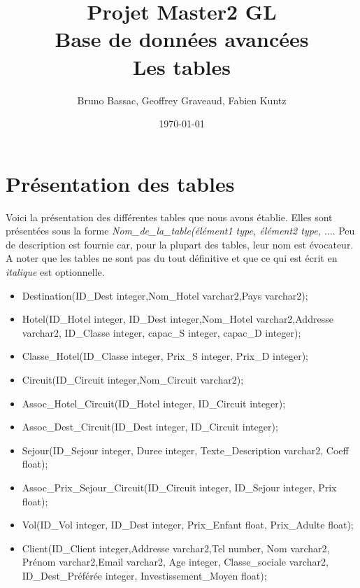 \documentclass[10pt]{article}
\author{Bruno Bassac, Geoffrey Graveaud, Fabien Kuntz}
\title{\textbf{Projet Master2 GL} \\
\textbf{Base de données avancées} \\
Les tables}
\date{\today}
\begin{document}
\maketitle

\section{Présentation des tables}
Voici la présentation des différentes tables que nous avons établie. Elles sont présentées sous la forme \textit{Nom\_de\_la\_table(élément1 type, élément2 type, $\dots$}. Peu de description est fournie car, pour la plupart des tables, leur nom est évocateur. A noter que les tables ne sont pas du tout définitive et que ce qui est écrit en \textit{italique} est optionnelle.\bigskip

\begin{itemize}
\item Destination(ID\_Dest integer,Nom_Hotel varchar2,Pays varchar2);\\
\item Hotel(ID\_Hotel integer, ID\_Dest integer,Nom_Hotel varchar2,Addresse varchar2, ID\_Classe integer, capac\_S integer, capac\_D integer);\\
\item Classe\_Hotel(ID\_Classe integer, Prix\_S integer, Prix\_D integer);\\
\item Circuit(ID\_Circuit integer,Nom\_Circuit varchar2);\\
\item Assoc\_Hotel\_Circuit(ID\_Hotel integer, ID\_Circuit integer);\\
\item Assoc\_Dest\_Circuit(ID\_Dest integer, ID\_Circuit integer);\\
\item Sejour(ID\_Sejour integer, Duree integer, Texte\_Description varchar2, Coeff float);\\
\item Assoc\_Prix\_Sejour\_Circuit(ID\_Circuit integer, ID\_Sejour integer, Prix float);\\
\item Vol(ID\_Vol integer, ID\_Dest integer, Prix\_Enfant float, Prix\_Adulte float);\\
\item Client(ID\_Client integer,Addresse varchar2,Tel number, Nom varchar2, Prénom varchar2,Email varchar2, Age integer, Classe\_sociale varchar2, ID\_Dest\_Préférée integer, Investissement\_Moyen float);\\

\end{itemize}
\end{document}
